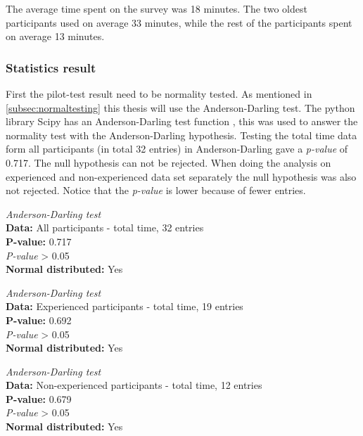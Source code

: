 The average time spent on the survey was 18 minutes. The two oldest participants used on average 33 minutes, while the rest of the participants spent on average 13 minutes. 


\subsubsection{Statistics result}
First the pilot-test result need to be normality tested. As mentioned in \ref{subsec:normaltesting} this thesis will use the Anderson-Darling test. The python library Scipy has an Anderson-Darling test function \citep{TheScipycommunity2017}, this was used to answer the normality test with the Anderson-Darling hypothesis. Testing the total time data form all participants (in total 32 entries) in Anderson-Darling gave a \textit{p-value} of 0.717. The null hypothesis can not be rejected. When doing the analysis on experienced and non-experienced data set separately the null hypothesis was also not rejected. Notice that the \textit{p-value} is lower because of fewer entries. \newline

\begin{framed}{\noindent\centering
\textit{Anderson-Darling test} \\
\textbf{Data:} All participants - total time, 32 entries\\
  \textbf{P-value:} 0.717  \\
    \textit{P-value} > 0.05\\
  \textbf{Normal distributed:} Yes
  \par}
\end{framed}


\begin{framed}{\noindent\centering
\textit{Anderson-Darling test} \\
\textbf{Data:} Experienced participants - total time, 19 entries\\
  \textbf{P-value:} 0.692  \\
    \textit{P-value} > 0.05\\
  \textbf{Normal distributed:} Yes
  \par}
\end{framed}


\begin{framed}{\noindent\centering
\textit{Anderson-Darling test} \\
\textbf{Data:} Non-experienced participants - total time, 12 entries\\
  \textbf{P-value:} 0.679  \\
    \textit{P-value} > 0.05 \\
  \textbf{Normal distributed:} Yes
  \par}
\end{framed}



